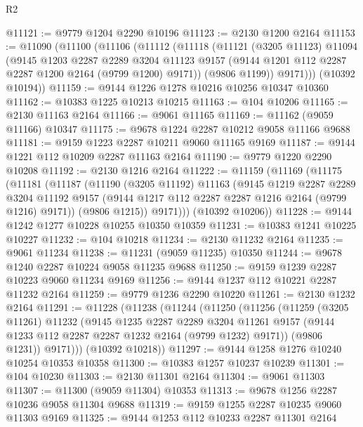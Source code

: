 \begin{lexlean}{R2}
\begin{coremodule}
@11121 := @9779 @1204 @2290 @10196
@11123 := @2130 @1200 @2164
@11153 := @11090
    (@11100
      (@11106
        (@11112
          (@11118
            (@11121
              (@3205 @11123)
              @11094
              (@9145
                @1203
                @2287
                @2289
                @3204
                @11123
                @9157
                (@9144 @1201 @112 @2287 @2287 @1200 @2164 (@9799 @1200) @9171))
              (@9806 @1199))
            @9171)))
      (@10392 @10194))
@11159 := @9144 @1226 @1278 @10216 @10256 @10347 @10360
@11162 := @10383 @1225 @10213 @10215
@11163 := @104 @10206
@11165 := @2130 @11163 @2164
@11166 := @9061 @11165
@11169 := @11162 (@9059 @11166) @10347
@11175 := @9678 @1224 @2287 @10212 @9058 @11166 @9688
@11181 := @9159 @1223 @2287 @10211 @9060 @11165 @9169
@11187 := @9144 @1221 @112 @10209 @2287 @11163 @2164
@11190 := @9779 @1220 @2290 @10208
@11192 := @2130 @1216 @2164
@11222 := @11159
    (@11169
      (@11175
        (@11181
          (@11187
            (@11190
              (@3205 @11192)
              @11163
              (@9145
                @1219
                @2287
                @2289
                @3204
                @11192
                @9157
                (@9144 @1217 @112 @2287 @2287 @1216 @2164 (@9799 @1216) @9171))
              (@9806 @1215))
            @9171)))
      (@10392 @10206))
@11228 := @9144 @1242 @1277 @10228 @10255 @10350 @10359
@11231 := @10383 @1241 @10225 @10227
@11232 := @104 @10218
@11234 := @2130 @11232 @2164
@11235 := @9061 @11234
@11238 := @11231 (@9059 @11235) @10350
@11244 := @9678 @1240 @2287 @10224 @9058 @11235 @9688
@11250 := @9159 @1239 @2287 @10223 @9060 @11234 @9169
@11256 := @9144 @1237 @112 @10221 @2287 @11232 @2164
@11259 := @9779 @1236 @2290 @10220
@11261 := @2130 @1232 @2164
@11291 := @11228
    (@11238
      (@11244
        (@11250
          (@11256
            (@11259
              (@3205 @11261)
              @11232
              (@9145
                @1235
                @2287
                @2289
                @3204
                @11261
                @9157
                (@9144 @1233 @112 @2287 @2287 @1232 @2164 (@9799 @1232) @9171))
              (@9806 @1231))
            @9171)))
      (@10392 @10218))
@11297 := @9144 @1258 @1276 @10240 @10254 @10353 @10358
@11300 := @10383 @1257 @10237 @10239
@11301 := @104 @10230
@11303 := @2130 @11301 @2164
@11304 := @9061 @11303
@11307 := @11300 (@9059 @11304) @10353
@11313 := @9678 @1256 @2287 @10236 @9058 @11304 @9688
@11319 := @9159 @1255 @2287 @10235 @9060 @11303 @9169
@11325 := @9144 @1253 @112 @10233 @2287 @11301 @2164

\end{coremodule}
\end{lexlean}
